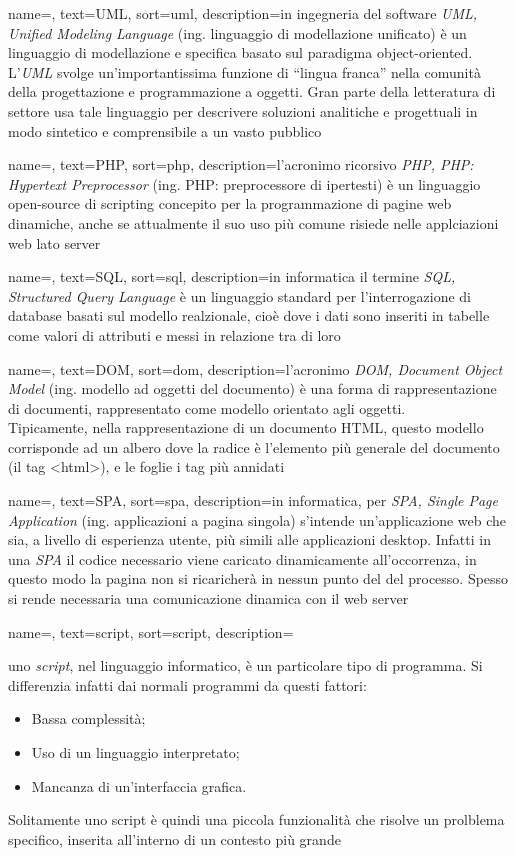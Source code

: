 {
    name=,
    text=UML,
    sort=uml,
    description={in ingegneria del software \emph{UML, Unified Modeling Language} (ing. linguaggio di modellazione unificato) è un linguaggio di modellazione e specifica basato sul paradigma object-oriented. L'\emph{UML} svolge un'importantissima funzione di ``lingua franca'' nella comunità della progettazione e programmazione a oggetti. Gran parte della letteratura di settore usa tale linguaggio per descrivere soluzioni analitiche e progettuali in modo sintetico e comprensibile a un vasto pubblico}
}

{
	name=,
	text=PHP,
	sort=php,
	description={l'acronimo ricorsivo \emph{PHP, PHP: Hypertext Preprocessor} (ing. PHP: preprocessore di ipertesti) è un linguaggio open-source di scripting concepito per la programmazione di pagine web dinamiche, anche se attualmente il suo uso più comune risiede nelle applciazioni web lato server}
}

{
	name=,
	text=SQL,
	sort=sql,
	description={in informatica il termine \emph{SQL, Structured Query Language} è un linguaggio standard per l'interrogazione di database basati sul modello realzionale, cioè dove i dati sono inseriti in tabelle come valori di attributi e messi in relazione tra di loro}
}

{
	name=,
	text=DOM,
	sort=dom,
	description={l'acronimo \emph{DOM, Document Object Model} (ing.  modello ad oggetti del documento) è una forma di rappresentazione di documenti, rappresentato come modello orientato agli oggetti.\\
	Tipicamente, nella rappresentazione di un documento HTML, questo modello corrisponde ad un albero dove la radice è l'elemento più generale del documento (il tag <html>), e le foglie i tag più annidati}
}

{
	name=,
	text=SPA,
	sort=spa,
	description={in informatica, per \emph{SPA, Single Page Application} (ing. applicazioni a pagina singola) s'intende un'applicazione web che sia, a livello di esperienza utente, più simili alle applicazioni desktop. Infatti in una \emph{SPA} il codice necessario viene caricato dinamicamente all'occorrenza, in questo modo la pagina non si ricaricherà in nessun punto del del processo. Spesso si rende necessaria una comunicazione dinamica con il web server}
}


{
	name=,
	text=script,
	sort=script,
	description={uno \emph{script}, nel linguaggio informatico, è un particolare tipo di programma. Si differenzia infatti dai normali programmi da questi fattori:
	\begin{itemize}
		\item Bassa complessità;
		\item Uso di un linguaggio interpretato;
		\item Mancanza di un'interfaccia grafica.
	\end{itemize}
	Solitamente uno script è quindi una piccola funzionalità che risolve un prolblema specifico, inserita all'interno di un contesto più grande}
}

